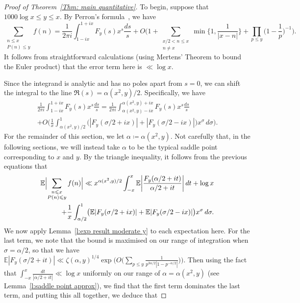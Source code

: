 \documentclass[10pt,a4paper]{amsart}
\def\E{\mathbb E}
\def\leq {\leqslant}
\begin{document}
\begin{proof}[Proof of Theorem~\ref{Thm: main quantitative}]

To begin, suppose that $1000 \log x \leq y \leq x$. By Perron's formula~\cite[Corollary~5.3]{MV2007}, we have
\[
\sum_{\substack{n \leq x \\ P(n) \leq y}} f(n) = \frac{1}{2 \pi i} \int_{1 - i x}^{1 + ix} F_y (s) x^s \frac{ds}{s} + O \Biggl( 1 + \sum_{\substack{x/2 < n \leq x \\ n \neq x}} \min \biggl\{ 1, \frac{1}{|x-n|} \biggr\} + \prod_{p \leq y} \biggl( 1 - \frac{1}{p} \biggr)^{-1} \Biggr).
\]
It follows from straightforward calculations (using Mertens' Theorem to bound the Euler product) that the error term here is $\ll \log x$. 

Since the integrand is analytic and has no poles apart from $s=0$, we can shift the integral to the line $\Re(s) = \alpha(x^2, y)/2$. Specifically, we have
\begin{multline*}
\frac{1}{2 \pi i} \int_{1 - i x}^{1 + ix} F_y (s) x^s \frac{ds}{s} = \frac{1}{2 \pi i} \int_{\alpha (x^2, y) - ix}^{\alpha (x^2, y) + ix} F_y (s) x^s \frac{ds}{s} \\  
+ O \biggl( \frac{1}{x} \int_{\alpha (x^2, y)/2}^1 \bigl( |F_y (\sigma / 2 + ix)| + |F_y (\sigma / 2 - ix)| \bigr) x^{\sigma} \, d \sigma \biggr) .
\end{multline*}
For the remainder of this section, we let $\alpha \coloneqq \alpha (x^2, y)$. Not carefully that, in the following sections, we will instead take $\alpha$ to be the typical saddle point corresponding to $x$ and $y$. By the triangle inequality, it follows from the previous equations that 
\begin{equation}\label{eqn: whole}
   \begin{split}
       \E \Bigl| \sum_{\substack{n \leq x \\ P(n) \leq y}} f(n) \Bigr| \ll  x^{\alpha(x^2, y)/2} \int_{-x}^{x} \E \biggl| \frac{F_y (\alpha / 2 + it)}{\alpha / 2 + it} \biggr| \, dt + \log x \\ 
+ \frac{1}{x} \int_{\alpha/2}^1 \bigl( \E |F_y (\sigma / 2 + ix)| + \E |F_y (\sigma / 2 - ix)| \bigr) x^{\sigma} \, d \sigma. 
   \end{split} 
\end{equation}
We now apply Lemma~\ref{l:exp result moderate y} to each expectation here. For the last term, we note that the bound is maximised on our range of integration when $\sigma = \alpha/2$, so that we have $\E |F_y (\sigma / 2 + it)| \ll \zeta(\alpha, y)^{1/4} \exp \bigl( O \bigl( \sum_{p \leq y} \frac{1}{p^{3 \alpha / 2} | 1 - p^{-\alpha /2}|} \bigr) \bigr)$. Then using the fact that $\int_{-x}^{x} \frac{dt}{|\alpha/2 + it|} \ll \log x$ uniformly on our range of $\alpha = \alpha (x^2, y)$ (see Lemma~\ref{l:saddle point approx}), we find that the first term dominates the last term, and putting this all together, we deduce that

\end{proof}
\end{document}

